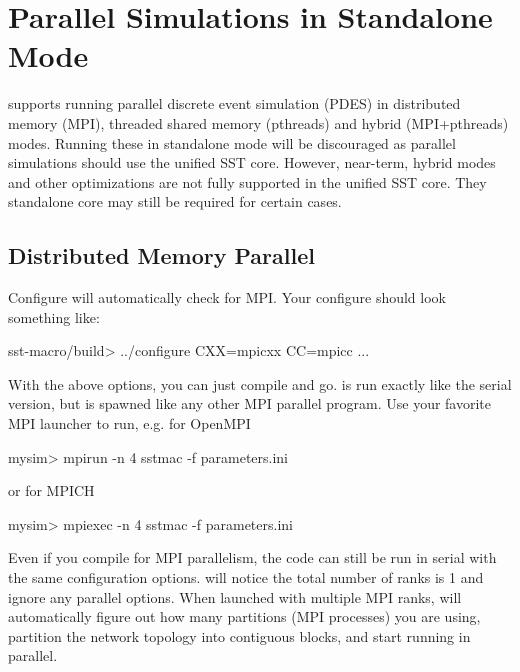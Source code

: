 \section{Parallel Simulations in Standalone Mode}
\label{sec:PDES}

\sstmacro supports running parallel discrete event simulation (PDES) in distributed memory (MPI), threaded shared memory (pthreads) and hybrid (MPI+pthreads) modes.  Running these in standalone mode will be discouraged as parallel simulations should use the unified SST core. However, near-term, hybrid modes and other optimizations are not fully supported in the unified SST core. They standalone core may still be required for certain cases.

\subsection{Distributed Memory Parallel}
\label{subsec:mpiparallel}
Configure will automatically check for MPI.
Your configure should look something like:

\begin{ShellCmd}
sst-macro/build> ../configure CXX=mpicxx CC=mpicc ...
\end{ShellCmd}
With the above options, you can just compile and go.
\sstmacro is run exactly like the serial version, but is spawned like any other MPI parallel program.
Use your favorite MPI launcher to run, e.g. for OpenMPI

\begin{ShellCmd}
mysim> mpirun -n 4 sstmac -f parameters.ini
\end{ShellCmd}
or for MPICH

\begin{ShellCmd}
mysim> mpiexec -n 4 sstmac -f parameters.ini
\end{ShellCmd}

Even if you compile for MPI parallelism, the code can still be run in serial with the same configuration options.
\sstmacro will notice the total number of ranks is 1 and ignore any parallel options.
When launched with multiple MPI ranks, \sstmacro will automatically figure out how many partitions (MPI processes) 
you are using, partition the network topology into contiguous blocks, and start running in parallel.   

